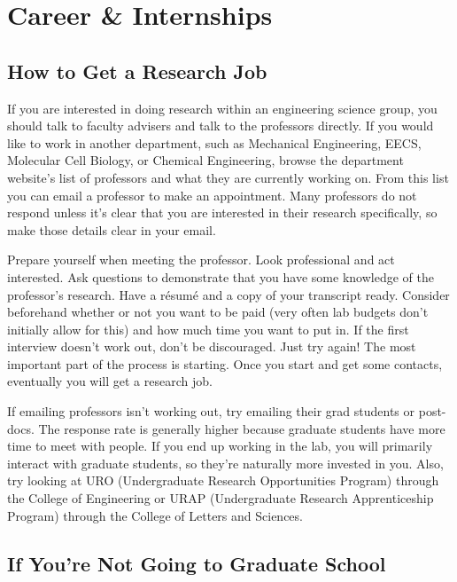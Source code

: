 \chapter*{Career \& Internships}

\section*{How to Get a Research Job}

If you are interested in doing research within an engineering science group, you should talk to faculty advisers and talk to the professors directly. If you would like to work in another department, such as Mechanical Engineering, EECS, Molecular Cell Biology, or Chemical Engineering, browse the department website's list of professors and what they are currently working on. From this list you can email a professor to make an appointment. Many professors do not respond unless it's clear that you are interested in their research specifically, so make those details clear in your email. 

Prepare yourself when meeting the professor. Look professional and act interested. Ask questions to demonstrate that you have some knowledge of the professor’s research. Have a r\'{e}sum\'{e} and a copy of your transcript ready. Consider beforehand whether or not you want to be paid (very often lab budgets don’t initially allow for this) and how much time you want to put in. If the first interview doesn’t work out, don’t be discouraged. Just try again! The most important part of the process is starting. Once you start and get some contacts, eventually you will get a research job. 

If emailing professors isn't working out, try emailing their grad students or post-docs. The response rate is generally higher because graduate students have more time to meet with people. If you end up working in the lab, you will primarily interact with graduate students, so they're naturally more invested in you. Also, try looking at URO (Undergraduate Research Opportunities Program) through the College of Engineering or URAP (Undergraduate Research Apprenticeship Program) through the College of Letters and Sciences.

\section*{If You’re Not Going to Graduate School}

